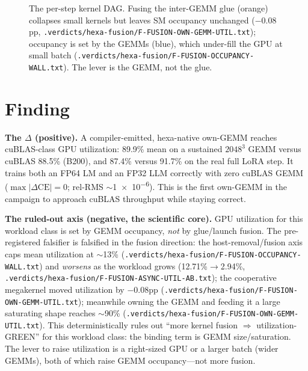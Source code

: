 \documentclass[11pt,a4paper]{article}
\newcommand{\vd}[1]{\texttt{.verdicts/hexa-fusion/#1.txt}}
\begin{document}
\begin{figure}[h]
\centering
{}
\caption{The per-step kernel DAG. Fusing the inter-GEMM glue (orange) collapses
small kernels but leaves SM occupancy unchanged ($-0.08$pp,
\vd{F-FUSION-OWN-GEMM-UTIL}); occupancy is set by the GEMMs (blue), which
under-fill the GPU at small batch (\vd{F-FUSION-OCCUPANCY-WALL}). The lever is
the GEMM, not the glue.}
\label{fig:dag}
\end{figure}

\section{Finding}
\label{sec:finding}

\noindent\textbf{The $\Delta$ (positive).} A compiler-emitted, hexa-native
own-GEMM reaches cuBLAS-class GPU utilization: 89.9\% mean on a sustained
$2048^3$ GEMM versus cuBLAS 88.5\% (B200), and 87.4\% versus 91.7\% on the real
full LoRA step. It trains both an FP64 LM and an FP32 LLM correctly with zero
cuBLAS GEMM ($\max|\Delta\mathrm{CE}|=0$; rel-RMS $\sim$\SI{1e-6}{}). This is the
first own-GEMM in the campaign to approach cuBLAS throughput while staying
correct.

\noindent\textbf{The ruled-out axis (negative, the scientific core).} GPU
utilization for this workload class is set by GEMM occupancy, \emph{not} by
glue/launch fusion. The pre-registered falsifier is falsified in the fusion
direction: the host-removal/fusion axis caps mean utilization at $\sim$13\%
(\vd{F-FUSION-OCCUPANCY-WALL}) and \emph{worsens} as the workload grows
(12.71\%$\to$2.94\%, \vd{F-FUSION-ASYNC-UTIL-AB}); the cooperative megakernel
moved utilization by $-0.08$pp (\vd{F-FUSION-OWN-GEMM-UTIL}); meanwhile owning the
GEMM and feeding it a large saturating shape reaches $\sim$90\%
(\vd{F-FUSION-OWN-GEMM-UTIL}). This deterministically rules out
``more kernel fusion $\Rightarrow$ utilization-GREEN'' for this workload class:
the binding term is GEMM size/saturation. The lever to raise utilization is a
right-sized GPU or a larger batch (wider GEMMs), both of which raise GEMM
occupancy---not more fusion.
\end{document}

